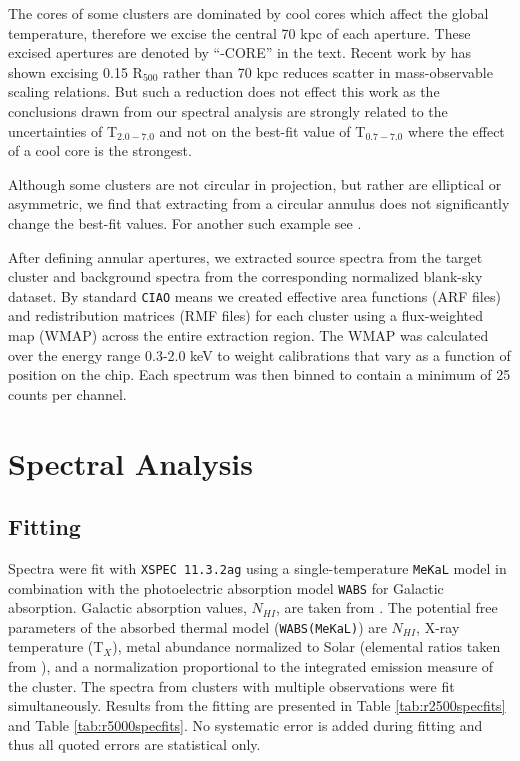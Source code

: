 \documentclass{emulateapj}
\newcommand{\hard}{T$_{2.0-7.0}$ }
\newcommand{\full}{T$_{0.7-7.0}$ }
\newcommand{\tx}{T$_{X}$}
\begin{document}
The cores of some clusters are dominated by cool cores which affect
the global temperature, therefore we excise the central 70 kpc of each
aperture. These excised apertures are denoted by ``-CORE'' in the
text. Recent work by \cite{2007astro.ph..3504M} has shown excising
0.15 R$_{500}$ rather than 70 kpc reduces scatter in mass-observable
scaling relations. But such a reduction does not effect this work as
the conclusions drawn from our spectral analysis are strongly related
to the uncertainties of \hard and not on the best-fit value of \full
where the effect of a cool core is the strongest.

Although some clusters are not circular in projection, but rather are
elliptical or asymmetric, we find that extracting from a circular
annulus does not significantly change the best-fit values. For another
such example see \cite{2005MNRAS.359.1481B}.

After defining annular apertures, we extracted source spectra from the
target cluster and background spectra from the corresponding
normalized blank-sky dataset. By standard {\tt CIAO} means we created
effective area functions (ARF files) and redistribution matrices (RMF
files) for each cluster using a flux-weighted map (WMAP) across the
entire extraction region. The WMAP was calculated over the energy
range 0.3-2.0 keV to weight calibrations that vary as a function of
position on the chip. Each spectrum was then binned to contain a
minimum of 25 counts per channel.

\section{Spectral Analysis} \label{sec:specan}

\subsection{Fitting} \label{sec:fitting}

Spectra were fit with {\tt XSPEC 11.3.2ag} \citep{1996ASPC..101...17A}
using a single-temperature {\tt MeKaL} model in combination with the
photoelectric absorption model {\tt WABS} \citep{1983ApJ...270..119M}
for Galactic absorption. Galactic absorption values, $N_{HI}$, are taken from
\cite{1990ARA&A..28..215D}. The potential free parameters of the
absorbed thermal model ({\tt WABS(MeKaL)}) are $N_{HI}$, X-ray
temperature (\tx), metal abundance normalized to Solar (elemental ratios taken
from \cite{1989GeCoA..53..197A}), and a normalization
proportional to the integrated emission measure of the cluster. The
spectra from clusters with multiple observations were fit
simultaneously. Results from the fitting are presented in Table
\ref{tab:r2500specfits} and Table \ref{tab:r5000specfits}. No
systematic error is added during fitting and thus all quoted errors
are statistical only.
\end{document}
